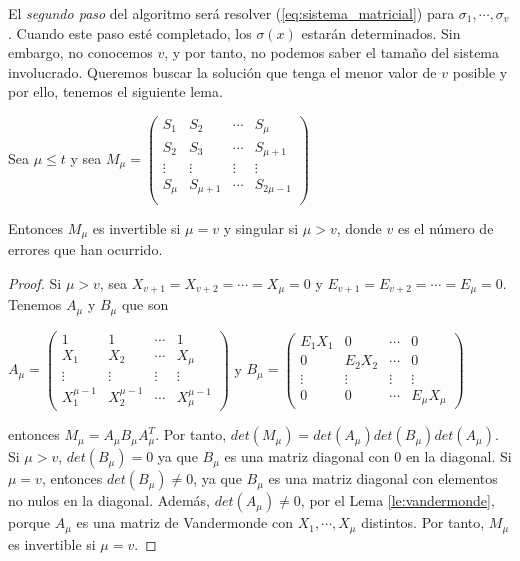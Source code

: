 El \textit{segundo paso} del algoritmo será resolver (\ref{eq:sistema_matricial}) para $\sigma_1,\cdots,\sigma_v$. Cuando este paso esté completado, los $\sigma(x)$ estarán determinados. Sin embargo, no conocemos $v$, y por tanto, no podemos saber el tamaño del sistema involucrado. Queremos buscar la solución que tenga el menor valor de $v$ posible y por ello, tenemos el siguiente lema.

\begin{lemma}
Sea $\mu \leq t$ y sea 
$M_\mu = \begin{pmatrix}
			S_1 & S_2 & \cdots &  S_\mu \\
			S_2 & S_3  & \cdots &  S_{\mu+1} \\
 		\vdots & \vdots & \vdots & \vdots  \\
			S_\mu & S_{\mu+1} & \cdots & S_{2\mu-1} \\
	\end{pmatrix}$

Entonces $M_\mu$ es invertible si $\mu = v$ y singular si $\mu > v$, donde $v$ es el número de errores que han ocurrido.
\end{lemma}

\begin{proof}
Si $\mu > v$, sea $X_{v+1} = X_{v+2} = \cdots = X_\mu = 0$ y $E_{v+1} = E_{v+2} = \cdots = E_\mu = 0$. Tenemos $A_\mu$ y $B_\mu$ que son 

$A_\mu = \begin{pmatrix}
			1 & 1 & \cdots &  1 \\
			X_1 & X_2  & \cdots &  X_\mu \\
 			\vdots & \vdots & \vdots & \vdots  \\
			X_1^{\mu-1} & X_2^{\mu-1} & \cdots & X_\mu^{\mu-1} 
	\end{pmatrix}$ 
	y $B_\mu = \begin{pmatrix}
			E_1X_1 & 0 & \cdots &  0 \\
			0 & E_2X_2  & \cdots &  0 \\
 			\vdots & \vdots & \vdots & \vdots  \\
			0 & 0 & \cdots & E_\mu X_\mu 
	\end{pmatrix}$

entonces $M_\mu = A_\mu B_\mu A_\mu^T$. Por tanto, $det(M_\mu) = det(A_\mu) det(B_\mu) det(A_\mu)$. Si $\mu > v$, $det(B_\mu) = 0$ ya que $B_\mu$ es una matriz diagonal con $0$ en la diagonal. Si $\mu = v$, entonces $det(B_\mu) \neq 0$, ya que $B_\mu$ es una matriz diagonal con elementos no nulos en la diagonal. Además, $det(A_\mu) \neq 0$, por el Lema \ref{le:vandermonde}, porque $A_\mu$ es una matriz de Vandermonde con $X_1,\cdots,X_\mu$ distintos. Por tanto, $M_\mu$ es invertible si $\mu = v$.
\end{proof}

